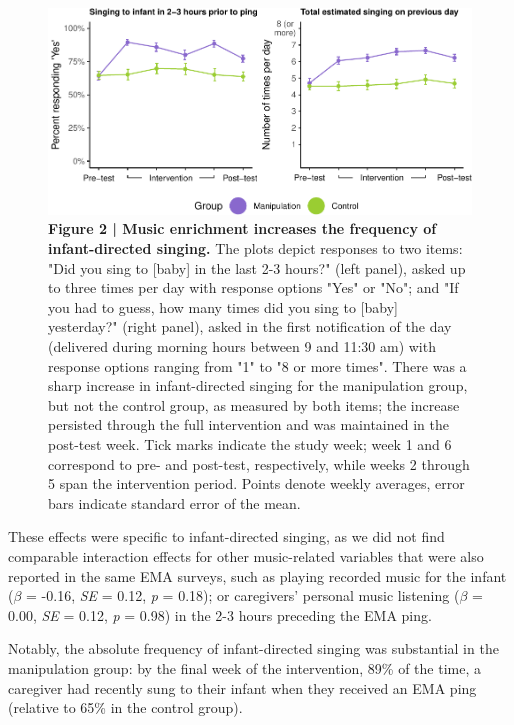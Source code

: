 \documentclass[
]{article}
\begin{document}
\begin{figure}[H]
\includegraphics{MIPH_childdev_files/figure-latex/fig2-1} \caption{\textbf{Figure 2 | Music enrichment increases the frequency of infant-directed singing.} The plots depict responses to two items: "Did you sing to [baby] in the last 2-3 hours?" (left panel), asked up to three times per day with response options "Yes" or "No"; and "If you had to guess, how many times did you sing to [baby] yesterday?" (right panel), asked in the first notification of the day (delivered during morning hours between 9 and 11:30 am) with response options ranging from "1" to "8 or more times". There was a sharp increase in infant-directed singing for the manipulation group, but not the control group, as measured by both items; the increase persisted through the full intervention and was maintained in the post-test week. Tick marks indicate the study week; week 1 and 6 correspond to pre- and post-test, respectively, while weeks 2 through 5 span the intervention period. Points denote weekly averages, error bars indicate standard error of the mean.}\label{fig:fig2}
\end{figure}

These effects were specific to infant-directed singing, as we did not
find comparable interaction effects for other music-related variables
that were also reported in the same EMA surveys, such as playing
recorded music for the infant (\(\beta\) = -0.16, \emph{SE} = 0.12,
\emph{p} = 0.18); or caregivers' personal music listening (\(\beta\) =
0.00, \emph{SE} = 0.12, \emph{p} = 0.98) in the 2-3 hours preceding the
EMA ping.

Notably, the absolute frequency of infant-directed singing was
substantial in the manipulation group: by the final week of the
intervention, 89\% of the time, a caregiver had recently sung to their
infant when they received an EMA ping (relative to 65\% in the control
group).
\end{document}
